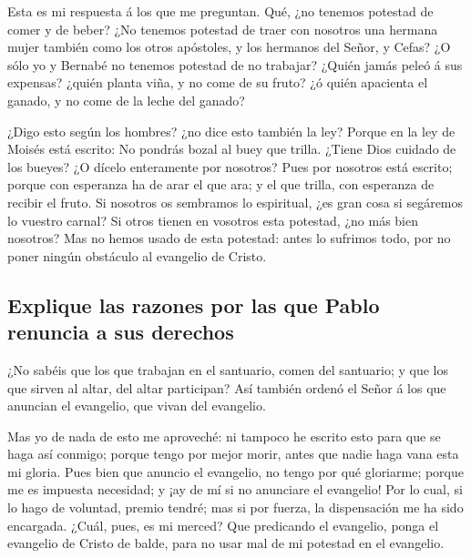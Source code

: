  Esta es mi respuesta á los que me preguntan.
 Qué, ¿no tenemos potestad de comer y de beber?
 ¿No tenemos potestad de traer con nosotros una hermana
mujer también como los otros apóstoles, y los hermanos del Señor, y
Cefas?  ¿O sólo yo y Bernabé no tenemos potestad de no
trabajar?  ¿Quién jamás peleó á sus expensas? ¿quién
planta viña, y no come de su fruto? ¿ó quién apacienta el ganado, y no
come de la leche del ganado?

 ¿Digo esto según los hombres? ¿no dice esto también la
ley?  Porque en la ley de Moisés está escrito: No pondrás
bozal al buey que trilla. ¿Tiene Dios cuidado de los bueyes?
 ¿O dícelo enteramente por nosotros? Pues por nosotros
está escrito; porque con esperanza ha de arar el que ara; y el que
trilla, con esperanza de recibir el fruto.  Si nosotros
os sembramos lo espiritual, ¿es gran cosa si segáremos lo vuestro
carnal?  Si otros tienen en vosotros esta potestad, ¿no
más bien nosotros? Mas no hemos usado de esta potestad: antes lo
sufrimos todo, por no poner ningún obstáculo al evangelio de Cristo.

\hypertarget{explique-las-razones-por-las-que-pablo-renuncia-a-sus-derechos}{%
\subsection{Explique las razones por las que Pablo renuncia a sus
derechos}\label{explique-las-razones-por-las-que-pablo-renuncia-a-sus-derechos}}

 ¿No sabéis que los que trabajan en el santuario, comen
del santuario; y que los que sirven al altar, del altar participan?
 Así también ordenó el Señor á los que anuncian el
evangelio, que vivan del evangelio.

 Mas yo de nada de esto me aproveché: ni tampoco he
escrito esto para que se haga así conmigo; porque tengo por mejor morir,
antes que nadie haga vana esta mi gloria.  Pues bien que
anuncio el evangelio, no tengo por qué gloriarme; porque me es impuesta
necesidad; y ¡ay de mí si no anunciare el evangelio!  Por
lo cual, si lo hago de voluntad, premio tendré; mas si por fuerza, la
dispensación me ha sido encargada.  ¿Cuál, pues, es mi
merced? Que predicando el evangelio, ponga el evangelio de Cristo de
balde, para no usar mal de mi potestad en el evangelio.

